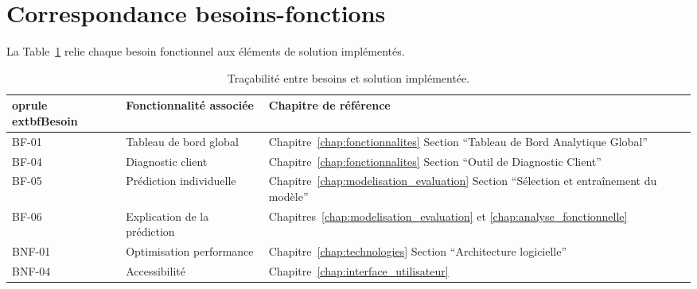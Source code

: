 \section{Correspondance besoins-fonctions}
La Table~\ref{tab:traceabilite_besoins} relie chaque besoin fonctionnel aux éléments de solution implémentés.

\begin{table}[H]
    \centering
    \begin{tabular}{p{3cm} p{5cm} p{5cm}}
        	oprule
        	extbf{Besoin} & \textbf{Fonctionnalité associée} & \textbf{Chapitre de référence} \\
        \midrule
        BF-01 & Tableau de bord global & Chapitre~\ref{chap:fonctionnalites} \newline Section ``Tableau de Bord Analytique Global'' \\
        BF-04 & Diagnostic client & Chapitre~\ref{chap:fonctionnalites} \newline Section ``Outil de Diagnostic Client'' \\
        BF-05 & Prédiction individuelle & Chapitre~\ref{chap:modelisation_evaluation} \newline Section ``Sélection et entraînement du modèle'' \\
        BF-06 & Explication de la prédiction & Chapitres~\ref{chap:modelisation_evaluation} et \ref{chap:analyse_fonctionnelle} \\
        BNF-01 & Optimisation performance & Chapitre~\ref{chap:technologies} \newline Section ``Architecture logicielle'' \\
        BNF-04 & Accessibilité & Chapitre~\ref{chap:interface_utilisateur} \\
        \bottomrule
    \end{tabular}
    \caption{Traçabilité entre besoins et solution implémentée.}
    \label{tab:traceabilite_besoins}
\end{table}
